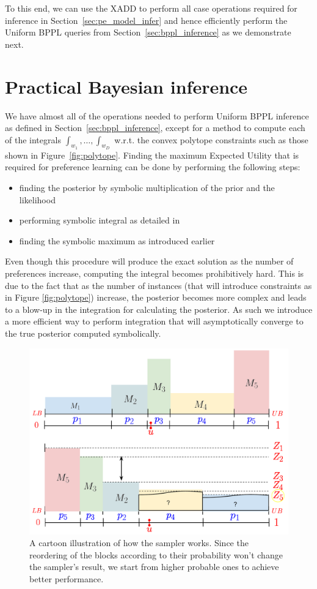 \documentclass[letterpaper]{article}
\begin{document}
To this end, we can use the XADD to perform all case operations
required for inference in Section~\ref{sec:pe_model_infer} and hence
efficiently perform the Uniform BPPL queries from
Section~\ref{sec:bppl_inference} as we demonstrate next.


\section{Practical Bayesian inference}
We have almost all of the operations needed to perform Uniform BPPL
inference as defined in Section~\ref{sec:bppl_inference}, except for a
method to compute each of the integrals $\int_{w_1},\ldots,\int_{w_D}$
w.r.t. the convex polytope constraints such as those shown in
Figure~\ref{fig:polytope}. Finding the maximum Expected Utility 
that is required for preference learning can be done by performing the following steps:
\begin{itemize}
\item finding the posterior by symbolic multiplication of the prior and the likelihood
\item performing symbolic integral as detailed in \cite{sve11}
\item finding the symbolic maximum as introduced earlier
\end{itemize}
Even though this procedure will produce the exact solution as the number 
of preferences increase, computing the integral becomes prohibitively hard. 
This is due to the fact that as the number of instances (that will introduce constraints as
in Figure \ref{fig:polytope}) increase, the posterior becomes more complex and leads to a blow-up in the integration for calculating the posterior. As such we introduce a more efficient way to perform integration that will asymptotically converge to the true posterior computed symbolically. 


\begin{figure}
	\centering
	\includegraphics[width=.5\textwidth]{fastgibbs}
	\caption{A cartoon illustration of how the sampler works. Since the reordering of the 
		blocks according to their probability won't change the sampler's result, we start from higher probable ones to achieve better performance.}
\end{figure}
\end{document}

